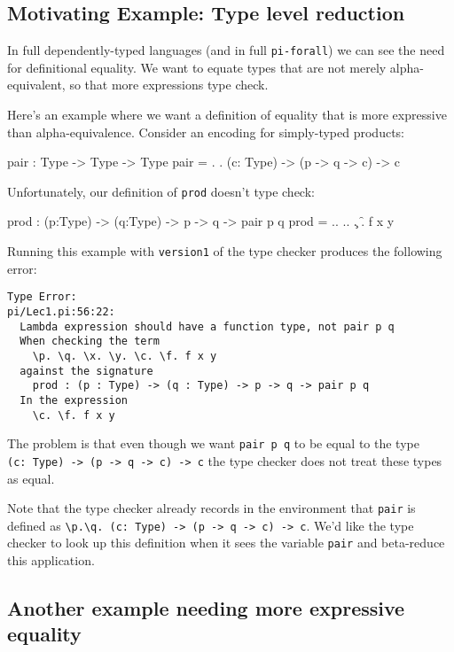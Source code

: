 \documentclass{article}
\newcommand\pif{\texttt{pi-forall}\xspace}
\theoremstyle{definition}
\begin{document}
\subsection{Motivating Example: Type level reduction}

In full dependently-typed languages (and in full \pif) we can see the need for
definitional equality. We want to equate types that are not merely
alpha-equivalent, so that more expressions type check.

Here's an example where we want a definition of equality
that is more expressive than alpha-equivalence. Consider an encoding for
simply-typed products:

\begin{piforall}
pair : Type -> Type -> Type
pair = \p. \q. (c: Type) -> (p -> q -> c) -> c
\end{piforall}

Unfortunately, our definition of \texttt{prod} doesn't type check:

\begin{piforall}
prod : (p:Type) -> (q:Type) -> p -> q -> pair p q
prod = \p.\q. \x.\y. \c. \f. f x y
\end{piforall}

Running this example with \texttt{version1} of the type checker produces
the following error:

\begin{verbatim}
Type Error:
pi/Lec1.pi:56:22:
  Lambda expression should have a function type, not pair p q
  When checking the term
    \p. \q. \x. \y. \c. \f. f x y
  against the signature
    prod : (p : Type) -> (q : Type) -> p -> q -> pair p q
  In the expression
    \c. \f. f x y
\end{verbatim}

The problem is that even though we want \texttt{pair\ p\ q} to be equal
to the type
\texttt{(c:\ Type)\ -\textgreater{}\ (p\ -\textgreater{}\ q\ -\textgreater{}\ c)\ -\textgreater{}\ c}
the type checker does not treat these types as equal.

Note that the type checker already records in the environment that
\texttt{pair} is defined as
\texttt{\textbackslash{}p.\textbackslash{}q.\ (c:\ Type)\ -\textgreater{}\ (p\ -\textgreater{}\ q\ -\textgreater{}\ c)\ -\textgreater{}\ c}.
We'd like the type checker to look up this definition when it sees the
variable \texttt{pair} and beta-reduce this application.

\subsection{Another example needing more expressive
equality}
\end{document}
